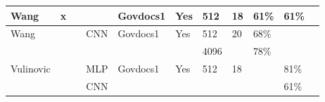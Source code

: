 \begin{table*}[!ht]
{\begin{tabular}{|l|l|l|l|l|l|l|l|l|l|l|}
Wang \cite{wang_sparse_2018}                   & x   &     &      & Govdocs1      & Yes   & 512      & 18       & 61\%       & 61\%      \\ \hline
Wang \cite{wang_file_2018}                     &     &     & CNN  & Govdocs1      & Yes   & 512      & 20       & 68\%       &           \\
                                               &     &     &      &               &       & 4096     &          & 78\%       &           \\ \hline
Vulinovic \cite{vulinovic_neural_2019}         &     &     & MLP  & Govdocs1      & Yes   & 512      & 18       &            & 81\%      \\
                                               &     &     & CNN  &               &       &          &          &            & 61\%      \\ \hline
\end{tabular}}
\end{table*}






